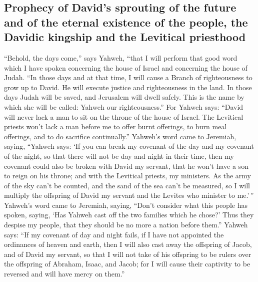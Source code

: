 \hypertarget{prophecy-of-davids-sprouting-of-the-future-and-of-the-eternal-existence-of-the-people-the-davidic-kingship-and-the-levitical-priesthood}{%
\subsection{Prophecy of David's sprouting of the future and of the
eternal existence of the people, the Davidic kingship and the Levitical
priesthood}\label{prophecy-of-davids-sprouting-of-the-future-and-of-the-eternal-existence-of-the-people-the-davidic-kingship-and-the-levitical-priesthood}}

 ``Behold, the days come,'' says Yahweh, ``that I will
perform that good word which I have spoken concerning the house of
Israel and concerning the house of Judah.  ``In those
days and at that time, I will cause a Branch of righteousness to grow up
to David. He will execute justice and righteousness in the land.
 In those days Judah will be saved, and Jerusalem will
dwell safely. This is the name by which she will be called: Yahweh our
righteousness.''  For Yahweh says: ``David will never
lack a man to sit on the throne of the house of Israel. 
The Levitical priests won't lack a man before me to offer burnt
offerings, to burn meal offerings, and to do sacrifice continually.''
 Yahweh's word came to Jeremiah, saying, 
``Yahweh says: `If you can break my covenant of the day and my covenant
of the night, so that there will not be day and night in their time,
 then my covenant could also be broken with David my
servant, that he won't have a son to reign on his throne; and with the
Levitical priests, my ministers.  As the army of the sky
can't be counted, and the sand of the sea can't be measured, so I will
multiply the offspring of David my servant and the Levites who minister
to me.'\,''  Yahweh's word came to Jeremiah, saying,
 ``Don't consider what this people has spoken, saying,
`Has Yahweh cast off the two families which he chose?' Thus they despise
my people, that they should be no more a nation before them.''
 Yahweh says: ``If my covenant of day and night fails, if
I have not appointed the ordinances of heaven and earth, 
then I will also cast away the offspring of Jacob, and of David my
servant, so that I will not take of his offspring to be rulers over the
offspring of Abraham, Isaac, and Jacob; for I will cause their captivity
to be reversed and will have mercy on them.''

